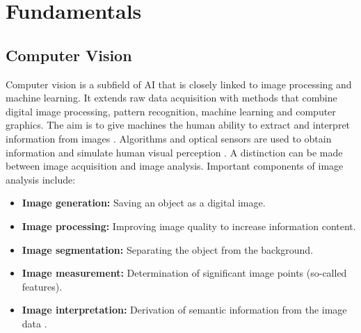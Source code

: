 \chapter{Fundamentals}
\label{ch:fundamentals}

\section{Computer Vision}
Computer vision is a subfield of \acrlong{AI} that is closely linked to image processing and machine learning. It extends raw data acquisition with methods that combine digital image processing, pattern recognition, machine learning and computer graphics. The aim is to give machines the human ability to extract and interpret information from images \citep{Wiley2018}. Algorithms and optical sensors are used to obtain information and simulate human visual perception \citep{Matiacevich2013}. A distinction can be made between image acquisition and image analysis. Important components of image analysis include:
\begin{itemize}
    \item \textbf{Image generation:} Saving an object as a digital image.
    \item \textbf{Image processing:} Improving image quality to increase information content.
    \item \textbf{Image segmentation:} Separating the object from the background.
    \item \textbf{Image measurement:} Determination of significant image points (so-called features).
    \item \textbf{Image interpretation:} Derivation of semantic information from the image data \citep{Mery2013}.
\end{itemize}






